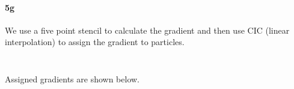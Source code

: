 \clearpage

\paragraph{5g}
We use a five point stencil to calculate the gradient and then use CIC (linear interpolation) to assign the gradient to particles.


\inputminted[firstline=75]{Python}{../pm_utils.py}
\inputminted[firstline=160]{Python}{../ex5.py}

Assigned gradients are shown below.
\inputminted[firstline=4]{text}{../output/ex5.txt}
